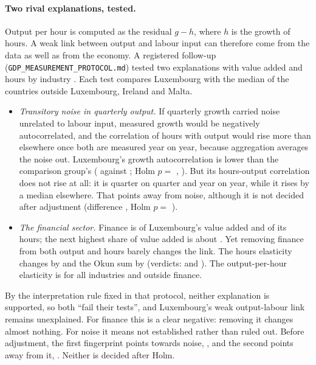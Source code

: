 \paragraph{Two rival explanations, tested.} Output per hour is computed as the residual
$g-h$, where $h$ is the growth of hours. A weak link between output and labour input can
therefore come from the data as well as from the economy. A registered follow-up
(\texttt{GDP\_MEASUREMENT\_PROTOCOL.md}) tested two explanations with value added and
hours by industry . Each test compares Luxembourg with
the median of the countries outside Luxembourg, Ireland and Malta.
\begin{itemize}
  \item \emph{Transitory noise in quarterly output.} If quarterly growth carried noise
    unrelated to labour input, measured growth would be negatively autocorrelated, and the
    correlation of hours with output would rise more than elsewhere once both are measured
    year on year, because aggregation averages the noise out. Luxembourg's growth
    autocorrelation is lower than the comparison group's ( against
    ; Holm $p=$ , ). But
    its hours-output correlation does not rise at all: it is  quarter on
    quarter and  year on year, while it rises by a median
     elsewhere. That points away from noise, although it is not
    decided after adjustment (difference  , Holm
    $p=$ ).
  \item \emph{The financial sector.} Finance is  of Luxembourg's value
    added and  of its hours; the next highest share of value added is
    about . Yet removing finance from both output and hours barely
    changes the link. The hours elasticity changes by  and the Okun
    sum by  (verdicts:  and
    ).
    The output-per-hour elasticity is  for all industries and
     outside finance.
\end{itemize}
By the interpretation rule fixed in that protocol, neither explanation is supported, so
both ``fail their tests'', and Luxembourg's weak output-labour link remains unexplained.
For finance this is a clear negative: removing it changes almost nothing. For noise it
means not established rather than ruled out. Before adjustment, the first fingerprint
points towards noise,  , and the second points away from
it,  . Neither is decided after Holm.

